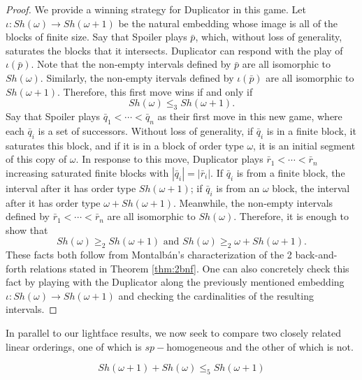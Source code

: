 \documentclass[11pt]{amsart}
\theoremstyle{definition}
\begin{document}
\begin{proof}

We provide a winning strategy for Duplicator in this game.
Let $\iota:Sh(\omega)\to Sh(\omega+1)$ be the natural embedding whose image is all of the blocks of finite size.
Say that Spoiler plays $\bar{p}$, which, without loss of generality, saturates the blocks that it intersects.
Duplicator can respond with the play of $\iota(\bar{p})$.
Note that the non-empty intervals defined by $\bar{p}$ are all isomorphic to $Sh(\omega)$.
Similarly, the non-empty itervals defined by $\iota(\bar{p})$ are all isomorphic to $Sh(\omega+1)$.
Therefore, this first move wins if and only if 
\[Sh(\omega) \leq_3 Sh(\omega+1).\]
Say that Spoiler plays $\bar{q}_1<\cdots<\bar{q}_n$ as their first move in this new game, where each $\bar{q}_i$ is a set of successors.
Without loss of generality, if $\bar{q}_i$ is in a finite block, it saturates this block, and if it is in a block of order type $\omega$, it is an initial segment of this copy of $\omega$.
In response to this move, Duplicator plays $\bar{r}_1<\cdots<\bar{r}_n$ increasing saturated finite blocks with $|\bar{q}_i|=|\bar{r}_i|$.
If $\bar{q}_i$ is from a finite block, the interval after it has order type $Sh(\omega+1)$; if $\bar{q}_i$ is from an $\omega$ block, the interval after it has order type $\omega+Sh(\omega+1)$.
Meanwhile, the non-empty intervals defined by $\bar{r}_1<\cdots<\bar{r}_n$ are all isomorphic to $Sh(\omega)$.
Therefore, it is enough to show that 
\[Sh(\omega) \geq_2 Sh(\omega+1) \text{  and  } Sh(\omega) \geq_2 \omega+ Sh(\omega+1). \]
These facts both follow from Montalb\'an's characterization of the 2 back-and-forth relations stated in Theorem \ref{thm:2bnf}.
One can also concretely check this fact by playing with the Duplicator along the previously mentioned embedding $\iota:Sh(\omega)\to Sh(\omega+1)$ and checking the cardinalities of the resulting intervals.

\end{proof}

In parallel to our lightface results, we now seek to compare two closely related linear orderings, one of which is $sp-$homogeneous and the other of which is not.

\begin{proposition}\label{prop:5below}
\[Sh(\omega+1)+Sh(\omega) \leq_5 Sh(\omega+1) \]
\end{proposition}
\end{document}

